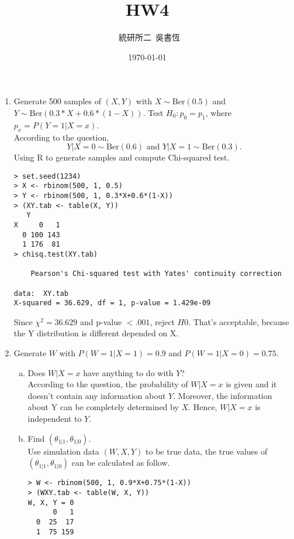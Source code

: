  
\pagestyle{fancy}
\fancyfoot[C]{\thepage}
\title{{\CF HW4}}
\author{{\  統研所二\  吳書恆}}
\date{{\CF \today}}


\maketitle \thispagestyle{fancy}
\fontsize{11}{20 pt}\selectfont

\begin{enumerate}
\item Generate 500 samples of $(X, Y)$ with $X\sim \text{Ber}(0.5)$ and $Y\sim \text{Ber}(0.3*X+0.6*(1-X))$. Test $H_0: p_0=p_1$, where $p_x=P(Y=1|X=x)$.\\
According to the question, \[Y|X=0\sim\text{Ber}(0.6)\text{ and }Y|X=1\sim\text{Ber}(0.3).\] Using R to generate samples and compute Chi-squared test.
\begin{lstlisting}
> set.seed(1234)
> X <- rbinom(500, 1, 0.5)
> Y <- rbinom(500, 1, 0.3*X+0.6*(1-X))
> (XY.tab <- table(X, Y))
   Y
X     0   1
  0 100 143
  1 176  81
> chisq.test(XY.tab)

	Pearson's Chi-squared test with Yates' continuity correction

data:  XY.tab
X-squared = 36.629, df = 1, p-value = 1.429e-09
\end{lstlisting}
Since $\chi^2 = 36.629$ and p-value $<.001$, reject $H0$. That's acceptable, because the Y distribution is different depended on X.

\item Generate $W$ with $P(W=1|X=1)=0.9$ and $P(W=1|X=0)=0.75$.
\begin{enumerate}[(a)]
\item Does $W|X=x$ have anything to do with $Y$?\\
According to the question, the probability of $W|X=x$ is given and it doesn't contain any information about $Y$. Moreover, the information about Y can be completely determined by $X$. Hence, $W|X=x$ is independent to $Y$.

\item Find $(\theta_{1|1}, \theta_{1|0})$.\\
Use simulation data $(W, X, Y)$ to be true data, the true values of $(\theta_{1|1}, \theta_{1|0})$ can be calculated as follow.
\begin{lstlisting}
> W <- rbinom(500, 1, 0.9*X+0.75*(1-X))
> (WXY.tab <- table(W, X, Y))
W, X, Y = 0
      0   1
  0  25  17
  1  75 159


\end{lstlisting}
\end{enumerate}
\end{enumerate}
